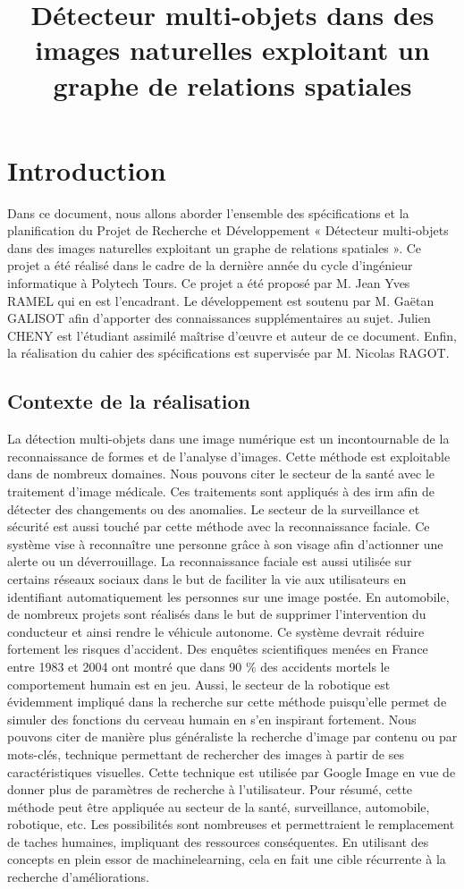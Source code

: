 \documentclass[debug,nodate,hideweeklyreports,noposter]{polytech/polytech}
\title{Détecteur multi-objets dans des images naturelles exploitant un graphe de relations spatiales}
\begin{document}
             
\chapter{Introduction}

Dans ce document, nous allons aborder l’ensemble des spécifications et la planification du Projet de Recherche et Développement « Détecteur multi-objets dans des images naturelles exploitant un graphe de relations spatiales ». Ce projet a été réalisé dans le cadre de la dernière année du cycle d’ingénieur informatique à Polytech Tours. 
Ce projet a été proposé par M. Jean Yves RAMEL qui en est l’encadrant. Le développement est soutenu par M. Gaëtan GALISOT afin d’apporter des connaissances supplémentaires au sujet. Julien CHENY est l’étudiant assimilé maîtrise d’œuvre et auteur de ce document. Enfin, la réalisation du cahier des spécifications est supervisée par M. Nicolas RAGOT.

\section{Contexte de la réalisation}

La détection multi-objets dans une image numérique est un incontournable de la reconnaissance de formes et de l’analyse d’images. 
Cette méthode est exploitable dans de nombreux domaines.
Nous pouvons citer le secteur de la santé avec le traitement d’image médicale. Ces traitements sont appliqués à des \gls{irm} afin de détecter des changements ou des anomalies.
Le secteur de la surveillance et sécurité est aussi touché par cette méthode avec la reconnaissance faciale. Ce système vise à reconnaître une personne grâce à son visage afin d’actionner une alerte ou un déverrouillage. La reconnaissance faciale est aussi utilisée sur certains réseaux sociaux dans le but de faciliter la vie aux utilisateurs en identifiant automatiquement les personnes sur une image postée.
En automobile, de nombreux projets sont réalisés dans le but de supprimer l’intervention du conducteur et ainsi rendre le véhicule autonome. Ce système devrait réduire fortement les risques d’accident. Des enquêtes scientifiques menées en France entre 1983 et 2004 ont montré que dans 90 \% des accidents mortels le comportement humain est en jeu.
Aussi, le secteur de la robotique est évidemment impliqué dans la recherche sur cette méthode puisqu’elle permet de simuler des fonctions du cerveau humain en s’en inspirant fortement.
Nous pouvons citer de manière plus généraliste la recherche d’image par contenu ou par mots-clés, technique permettant de rechercher des images à partir de ses caractéristiques visuelles. Cette technique est utilisée par Google Image en vue de donner plus de paramètres de recherche à l’utilisateur.
Pour résumé, cette méthode peut être appliquée au secteur de la santé, surveillance, automobile, robotique, etc. Les possibilités sont nombreuses et permettraient le remplacement de taches humaines, impliquant des ressources conséquentes. 
En utilisant des concepts en plein essor de \gls{machinelearning}, cela en fait une cible récurrente à la recherche d’améliorations.
\end{document}
